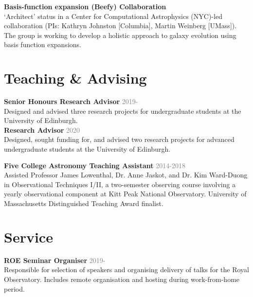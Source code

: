 \documentclass[margin, 11pt]{res} %
\begin{document}
\begin{resume}
{\bf Basis-function expansion (Beefy) Collaboration} \\
`Architect' status in a Center for Computational Astrophysics (NYC)-led collaboration (PIs: Kathryn Johnston [Columbia], Martin Weinberg [UMass]). The group is working to develop a holistic approach to galaxy evolution using basis function expansions.\\




\section{\sc \textcolor{redshade}{Teaching \& Advising}}


{\bf Senior Honours Research Advisor} \hfill\textcolor{grey}{2019-}\\
Designed and advised three research projects for undergraduate students at the University of Edinburgh.\\

{\bf Research Advisor} \hfill\textcolor{grey}{2020}\\
Designed, sought funding for, and advised two research projects for advanced undergraduate students at the University of Edinburgh.

{\bf Five College Astronomy Teaching Assistant} \hfill \textcolor{grey}{2014-2018}\\
Assisted Professor James Lowenthal, Dr. Anne Jaskot, and Dr. Kim Ward-Duong in Observational Techniques I/II, a two-semester observing course involving a yearly observational component at Kitt Peak National Observatory. University of Massachusetts Distinguished Teaching Award finalist.\\


\section{\sc \textcolor{redshade}{Service}}

{\bf ROE Seminar Organiser} \hfill\textcolor{grey}{2019-}\\
Responsible for selection of speakers and organising delivery of talks for the Royal Observatory. Includes remote organisation and hosting during work-from-home period.\\


\end{resume}
\end{document}

